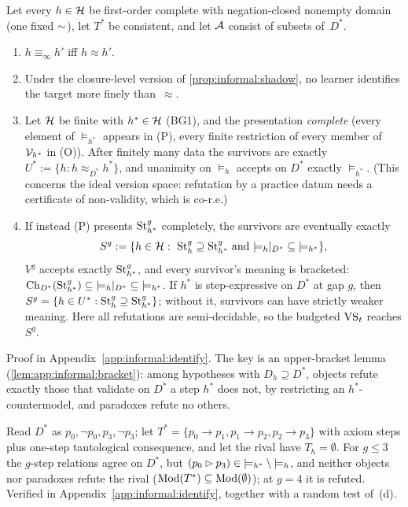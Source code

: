 \begin{theorem}\label{thm:informal:identify}
Let every $h\in\mathcal{H}$ be first-order complete with negation-closed nonempty domain (one fixed ${\sim}$), let $T^*$ be consistent, and let $\mathcal{A}$ consist of subsets of~$D^*$.
\begin{enumerate}[label=(\alph*)]
\item $h\equiv_\infty h'$ iff $h\approx h'$.
\item Under the closure-level version of \cref{prop:informal:shadow}, no learner identifies the target more finely than~$\approx$.
\item Let $\mathcal{H}$ be finite with $h^*\in\mathcal{H}$ (BG1), and the presentation \emph{complete} (every element of ${\models_{h^*}}$ appears in (P), every finite restriction of every member of $\mathcal V_{h^*}$ in (O)). After finitely many data the survivors are exactly $U^*:=\{h:h\approx_{D^*}h^*\}$, and unanimity on ${\models_h}$ accepts on $D^*$ exactly ${\models_{h^*}}$. (This concerns the ideal version space: refutation by a practice datum needs a certificate of non-validity, which is co-r.e.)
\item If instead (P) presents $\mathrm{St}^{g}_{h^*}$ completely, the survivors are eventually exactly
\[
S^g:=\{h\in\Hc:\ \Stg{g}{h}\supseteq\Stg{g}{h^*}\ \text{and}\ {\models_h}|_{D^*}\subseteq{\models_{h^*}}\},
\]
$V^g$ accepts exactly $\mathrm{St}^{g}_{h^*}$, and every survivor's meaning is bracketed: $\mathrm{Ch}_{D^*}(\mathrm{St}^{g}_{h^*})\subseteq{\models_h}|_{D^*}\subseteq{\models_{h^*}}$. If $h^*$ is step-expressive on $D^*$ at gap $g$, then $S^g=\{h\in U^*:\mathrm{St}^{g}_{h}\supseteq\mathrm{St}^{g}_{h^*}\}$; without it, survivors can have strictly weaker meaning. Here all refutations are semi-decidable, so the budgeted $\mathrm{VS}_t$ reaches $S^g$.
\end{enumerate}
\end{theorem}

Proof in Appendix~\ref{app:informal:identify}. The key is an upper-bracket lemma (\cref{lem:app:informal:bracket}): among hypotheses with $D_h\supseteq D^*$, objects refute exactly those that validate on $D^*$ a step $h^*$ does not, by restricting an $h^*$-countermodel, and paradoxes refute no others.

\begin{example}\label{ex:informal:weaker}
Read $D^*$ as $p_0,\neg p_0,p_3,\neg p_3$; let $T^*=\{p_0\to p_1,p_1\to p_2,p_2\to p_3\}$ with axiom steps plus one-step tautological consequence, and let the rival have $T_h=\emptyset$. For $g\le3$ the $g$-step relations agree on $D^*$, but $(p_0\rhd p_3)\in{\models_{h^*}}\setminus{\models_h}$, and neither objects nor paradoxes refute the rival ($\mathrm{Mod}(T^*)\subseteq\mathrm{Mod}(\emptyset)$); at $g=4$ it is refuted. Verified in Appendix~\ref{app:informal:identify}, together with a random test of~(d).
\end{example}

